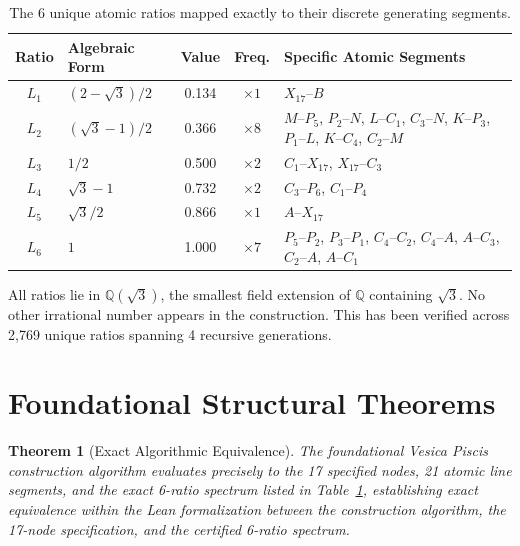 \documentclass[12pt, a4paper]{article}
\newtheorem{theorem}{Theorem}
\begin{document}
\begin{table}[h]
\centering
\begin{tabular}{@{}clccl@{}}
\toprule
\textbf{Ratio} & \textbf{Algebraic Form} & \textbf{Value} & \textbf{Freq.} & \textbf{Specific Atomic Segments} \\
\midrule
$L_1$ & $(2-\sqrt{3})/2$ & 0.134 & $\times 1$ & $X_{17}$--$B$ \\
$L_2$ & $(\sqrt{3}-1)/2$ & 0.366 & $\times 8$ & $M$--$P_5$, $P_2$--$N$, $L$--$C_1$, $C_3$--$N$, $K$--$P_3$, $P_1$--$L$, $K$--$C_4$, $C_2$--$M$ \\
$L_3$ & $1/2$ & 0.500 & $\times 2$ & $C_1$--$X_{17}$, $X_{17}$--$C_3$ \\
$L_4$ & $\sqrt{3}-1$ & 0.732 & $\times 2$ & $C_3$--$P_6$, $C_1$--$P_4$ \\
$L_5$ & $\sqrt{3}/2$ & 0.866 & $\times 1$ & $A$--$X_{17}$ \\
$L_6$ & $1$ & 1.000 & $\times 7$ & $P_5$--$P_2$, $P_3$--$P_1$, $C_4$--$C_2$, $C_4$--$A$, $A$--$C_3$, $C_2$--$A$, $A$--$C_1$ \\
\bottomrule
\end{tabular}
\caption{The 6 unique atomic ratios mapped exactly to their discrete generating segments.}
\label{tab:spectrum}
\end{table}

All ratios lie in $\mathbb{Q}(\sqrt{3})$, the smallest field extension of $\mathbb{Q}$ containing $\sqrt{3}$. No other irrational number appears in the construction. This has been verified across 2{,}769 unique ratios spanning 4 recursive generations.

\section{Foundational Structural Theorems}

\begin{theorem}[Exact Algorithmic Equivalence]
The foundational Vesica Piscis construction algorithm evaluates precisely to the 17 specified nodes, 21 atomic line segments, and the exact 6-ratio spectrum listed in Table~\ref{tab:spectrum}, establishing exact equivalence within the Lean formalization between the construction algorithm, the 17-node specification, and the certified 6-ratio spectrum.
\end{theorem}
\end{document}
